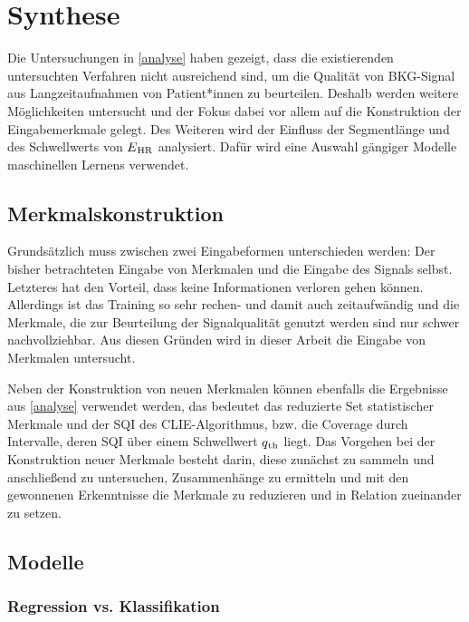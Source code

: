 \chapter{Synthese}

Die Untersuchungen in \ref{analyse} haben gezeigt, dass die existierenden untersuchten Verfahren nicht ausreichend sind, um die Qualität von \ac{BKG}-Signal aus Langzeitaufnahmen von Patient*innen zu beurteilen. Deshalb werden weitere Möglichkeiten untersucht und der Fokus dabei vor allem auf die Konstruktion der Eingabemerkmale gelegt. Des Weiteren wird der Einfluss der Segmentlänge und des Schwellwerts von $E\textsubscript{HR}$ analysiert. Dafür wird eine Auswahl gängiger Modelle maschinellen Lernens verwendet.

\section{Merkmalskonstruktion}

Grundsätzlich muss zwischen zwei Eingabeformen unterschieden werden: Der bisher betrachteten Eingabe von Merkmalen und die Eingabe des Signals selbst. Letzteres hat den Vorteil, dass keine Informationen verloren gehen können. Allerdings ist das Training so sehr rechen- und damit auch zeitaufwändig und die Merkmale, die zur Beurteilung der Signalqualität genutzt werden sind nur schwer nachvollziehbar. Aus diesen Gründen wird in dieser Arbeit die Eingabe von Merkmalen untersucht.

Neben der Konstruktion von neuen Merkmalen können ebenfalls die Ergebnisse aus \ref{analyse} verwendet werden, das bedeutet das reduzierte Set statistischer Merkmale und der \ac{SQI} des \ac{CLIE}-Algorithmus, bzw. die Coverage durch Intervalle, deren \ac{SQI} über einem Schwellwert $q\textsubscript{th}$ liegt. Das Vorgehen bei der Konstruktion neuer Merkmale besteht darin, diese zunächst zu sammeln und anschließend zu untersuchen, Zusammenhänge zu ermitteln und mit den gewonnenen Erkenntnisse die Merkmale zu reduzieren und in Relation zueinander zu setzen.


\section{Modelle}

\subsection{Regression vs. Klassifikation}

